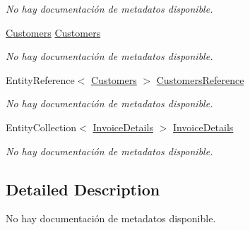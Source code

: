\begin{DoxyCompactItemize}
\begin{DoxyCompactList}\small\item\em No hay documentación de metadatos disponible. \end{DoxyCompactList}\item 
\hyperlink{class_microsoft_1_1_samples_1_1_kinect_1_1_basic_interactions_1_1_customers}{Customers} \hyperlink{class_microsoft_1_1_samples_1_1_kinect_1_1_basic_interactions_1_1_invoices_a7e38971396ed198299c0becde3c5a6f7}{Customers}
\begin{DoxyCompactList}\small\item\em No hay documentación de metadatos disponible. \end{DoxyCompactList}\item 
Entity\-Reference$<$ \hyperlink{class_microsoft_1_1_samples_1_1_kinect_1_1_basic_interactions_1_1_customers}{Customers} $>$ \hyperlink{class_microsoft_1_1_samples_1_1_kinect_1_1_basic_interactions_1_1_invoices_a52d70adcbfac0266c8d23be2bcb917f2}{Customers\-Reference}
\begin{DoxyCompactList}\small\item\em No hay documentación de metadatos disponible. \end{DoxyCompactList}\item 
Entity\-Collection$<$ \hyperlink{class_microsoft_1_1_samples_1_1_kinect_1_1_basic_interactions_1_1_invoice_details}{Invoice\-Details} $>$ \hyperlink{class_microsoft_1_1_samples_1_1_kinect_1_1_basic_interactions_1_1_invoices_adcf148d66cba78e98881946bae7c1e59}{Invoice\-Details}
\begin{DoxyCompactList}\small\item\em No hay documentación de metadatos disponible. \end{DoxyCompactList}\end{DoxyCompactItemize}


\subsection{Detailed Description}
No hay documentación de metadatos disponible. 



